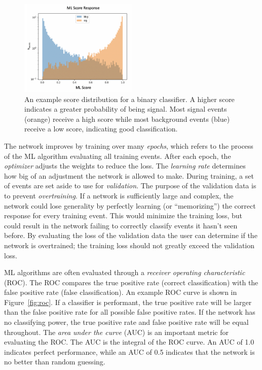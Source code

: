 \begin{figure}[!htbp]
\centering
   \includegraphics[width=0.5\textwidth]{figures/ml/ml_score_example}
    \caption{An example score distribution for a binary classifier. A higher score indicates a greater probability of being signal. Most signal events (orange) receive a high score while most background events (blue) receive a low score, indicating good classification.
    \label{fig:score_example}}
\end{figure}

The network improves by training over many \textit{epochs}, which refers to the process of the ML algorithm evaluating all training events.
After each epoch, the \textit{optimizer} adjusts the weights to reduce the loss.
The \textit{learning rate} determines how big of an adjustment the network is allowed to make. 
During training, a set of events are set aside to use for \textit{validation}.
The purpose of the validation data is to prevent \textit{overtraining}.
If a network is sufficiently large and complex, the network could lose generality by perfectly learning (or ``memorizing'') the correct response for every training event.
This would minimize the training loss, but could result in the network failing to correctly classify events it hasn't seen before. 
By evaluating the loss of the validation data the user can determine if the network is overtrained; the training loss should not greatly exceed the validation loss.

ML algorithms are often evaluated through a \textit{receiver operating characteristic} (ROC). 
The ROC compares the true positive rate (correct classification) with the false positive rate (false classification).
An example ROC curve is shown in Figure~\ref{fig:roc}. 
If a classifier is performant, the true positive rate will be larger than the false positive rate for all possible false positive rates.
If the network has no classifying power, the true positive rate and false positive rate will be equal throughout.
The \textit{area under the curve} (AUC) is an important metric for evaluating the ROC.
The AUC is the integral of the ROC curve.
An AUC of 1.0 indicates perfect performance, while an AUC of 0.5 indicates that the network is no better than random guessing.

